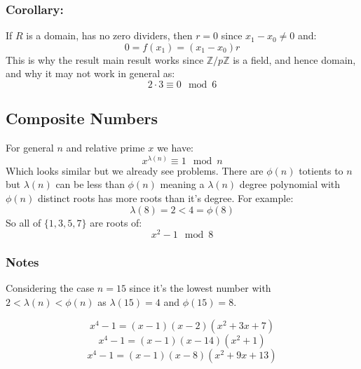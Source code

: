 \subsubsection{Corollary:}
If $R$ is a domain, 
has no zero dividers,
then $r=0$ since $x_1-x_0\neq 0$ and:
\[0 = f(x_1) = (x_1-x_0)r\]
This is why the result main result works since $\mathbb{Z}/p\mathbb{Z}$ is a field,
and hence domain,
and why it may not work in general as:
\[2\cdot 3 \equiv 0 \mod 6\]

\subsection{Composite Numbers}
For general $n$ and relative prime $x$ we have:
\[x^{\lambda(n)}\equiv 1 \mod n\]
Which looks similar but we already see problems.
There are $\phi(n)$ totients to $n$ but $\lambda(n)$ can be less than $\phi(n)$ meaning a $\lambda(n)$ degree polynomial with $\phi(n)$ distinct roots has more roots than it's degree.
For example:
\[\lambda(8) = 2 < 4 = \phi(8)\]
So all of $\{1,3,5,7\}$ are roots of:
\[x^2-1 \mod 8\]

\subsubsection{Notes}
Considering the case $n=15$ since it's the lowest number with $2<\lambda(n)<\phi(n)$ as $\lambda(15) = 4$ and $\phi(15) = 8$.

\[x^4-1 = (x-1)(x-2)(x^2+3x+7)\]
\[x^4-1 = (x-1)(x-14)(x^2+1)\]
\[x^4-1 = (x-1)(x-8)(x^2+9x+13)\]
